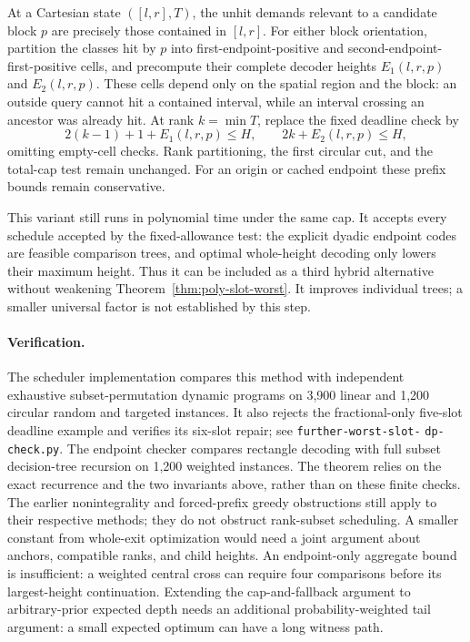 At a Cartesian state $([l,r],T)$, the unhit demands relevant to a
candidate block $p$ are precisely those contained in $[l,r]$.
For either block orientation, partition the classes hit by $p$
into first-endpoint-positive and second-endpoint-first-positive cells,
and precompute their complete decoder heights $E_1(l,r,p)$ and
$E_2(l,r,p)$. These cells depend only on the spatial region and the
block: an outside query cannot hit a contained interval, while an
interval crossing an ancestor was already hit. At rank $k=\min T$,
replace the fixed deadline check by
\[
 2(k-1)+1+E_1(l,r,p)\le H,\qquad
 2k+E_2(l,r,p)\le H,
\]
omitting empty-cell checks. Rank partitioning, the first circular
cut, and the total-cap test remain unchanged. For an origin or
cached endpoint these prefix bounds remain conservative.

This variant still runs in polynomial time under the same cap.
It accepts every schedule accepted by the fixed-allowance test:
the explicit dyadic endpoint codes are feasible comparison trees,
and optimal whole-height decoding only lowers their maximum height.
Thus it can be included as a third hybrid alternative without
weakening Theorem~\ref{thm:poly-slot-worst}. It improves individual
trees; a smaller universal factor is not established by this step.

\paragraph{Verification.}
The scheduler implementation compares this method with
independent exhaustive subset-permutation dynamic programs on 3,900
linear and 1,200 circular random and targeted instances. It also
rejects the fractional-only five-slot deadline example and verifies
its six-slot repair; see \texttt{further-worst-slot-}\allowbreak
\texttt{dp-check.py}. The endpoint checker compares rectangle decoding
with full subset decision-tree recursion on 1,200 weighted instances.
The theorem relies on the exact recurrence and
the two invariants above, rather than on these finite checks.
The earlier nonintegrality and forced-prefix greedy obstructions
still apply to their respective methods; they do not obstruct
rank-subset scheduling. A smaller constant from whole-exit optimization
would need a joint argument about anchors, compatible ranks, and child
heights. An endpoint-only aggregate bound is insufficient: a weighted
central cross can require four comparisons before its largest-height
continuation. Extending the cap-and-fallback argument to
arbitrary-prior expected depth needs an additional probability-weighted
tail argument: a small expected optimum can have a long witness path.
